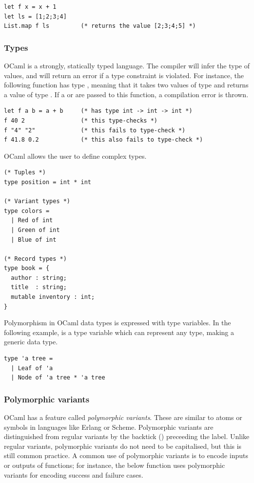 \begin{lstlisting}
let f x = x + 1
let ls = [1;2;3;4]
List.map f ls         (* returns the value [2;3;4;5] *)
\end{lstlisting}

\subsubsection{Types}

OCaml is a strongly, statically typed language. The compiler will
infer the type of values, and will return an error if a type
constraint is violated. For instance, the following function 
has type , meaning that it takes two values of
type  and returns a value of type . If a
 or  are passed to this function, a
compilation error is thrown.

\begin{lstlisting}
let f a b = a + b     (* has type int -> int -> int *)
f 40 2                (* this type-checks *)
f "4" "2"             (* this fails to type-check *)
f 41.8 0.2            (* this also fails to type-check *)
\end{lstlisting}

OCaml allows the user to define complex types.

\begin{lstlisting}
(* Tuples *)
type position = int * int

(* Variant types *)
type colors =
  | Red of int
  | Green of int
  | Blue of int

(* Record types *)
type book = {
  author : string;
  title  : string;
  mutable inventory : int;
}
\end{lstlisting}


Polymorphism in OCaml data types is expressed with type variables. In
the following example,  is a type variable which can
represent any type, making  a generic data type.

\begin{lstlisting}
type 'a tree =
  | Leaf of 'a
  | Node of 'a tree * 'a tree
\end{lstlisting}

\subsubsection{Polymorphic variants}

OCaml has a feature called \emph{polymorphic variants}. These are
similar to atoms or symbols in languages like Erlang or
Scheme. Polymorphic variants are distinguished from regular variants
by the backtick () preceeding the label. Unlike regular
variants, polymorphic variants do not need to be capitalised, but this
is still common practice. A common use of polymorphic variants is to
encode inputs or outputs of functions; for instance, the below
function uses polymorphic variants for encoding success and failure
cases.

